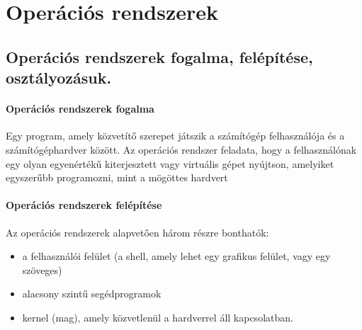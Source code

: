 \section{Operációs rendszerek}
\subsection{Operációs rendszerek fogalma, felépítése, osztályozásuk.}
\paragraph{Operációs rendszerek fogalma}
Egy program, amely közvetítő szerepet játszik a számítógép felhasználója
és a számítógéphardver között.
Az operációs rendszer feladata, hogy a felhasználónak egy olyan egyenértékű kiterjesztett
vagy virtuális gépet nyújtson, amelyiket egyszerűbb programozni, mint a mögöttes hardvert
\paragraph{Operációs rendszerek felépítése}
Az operációs rendszerek alapvetően három részre bonthatók:
	\begin{itemize}[nosep]
	\item a felhasználói felület (a shell, amely lehet egy grafikus felület, vagy egy szöveges)
	\item alacsony szintű segédprogramok
	\item kernel (mag), amely közvetlenül a hardverrel áll kapcsolatban.
	\end{itemize}
